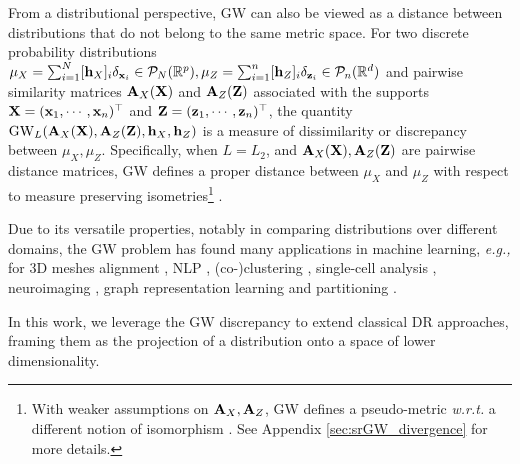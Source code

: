 From a distributional perspective, GW can also be viewed as a distance between distributions that do not belong to the same metric space. For two discrete probability distributions $\mu_X = \sum_{i=1}^N [{\mathbf{h}}_X]_i \delta_{{\mathbf{x}}_i} \in {\mathcal{P}}_N(\mathbb{R}^{p}), \mu_Z =\sum_{i=1}^n [{\mathbf{h}}_Z]_i \delta_{{\mathbf{z}}_i} \in {\mathcal{P}}_n(\mathbb{R}^d)$ and pairwise similarity matrices ${\mathbf{A}}_{X}({\mathbf{X}})$ and ${\mathbf{A}}_{Z}({\mathbf{Z}})$ associated with the supports ${\mathbf{X}} = ({\mathbf{x}}_1, \cdots, {\mathbf{x}}_n)^\top$ and ${\mathbf{Z}} = ({\mathbf{z}}_1, \cdots, {\mathbf{z}}_n)^\top$, the quantity $\operatorname{GW}_L ({\mathbf{A}}_{X}({\mathbf{X}}), {\mathbf{A}}_{Z}({\mathbf{Z}}), {\mathbf{h}}_X, {\mathbf{h}}_Z)$ is a measure of dissimilarity or discrepancy between $\mu_X, \mu_Z$. Specifically, when $L=L_2$, and ${\mathbf{A}}_{X}({\mathbf{X}}), {\mathbf{A}}_{Z}({\mathbf{Z}})$ are pairwise distance matrices, GW defines a proper distance between $\mu_X$ and $\mu_Z$ with respect to measure preserving isometries\footnote{With weaker assumptions on ${\mathbf{A}}_{X}, {\mathbf{A}}_{Z}$, GW defines a pseudo-metric \textit{w.r.t.} a different notion of isomorphism \citep{chowdhury2019gromov}. See Appendix \ref{sec:srGW_divergence} for more details.} \citep{memoli2011gromov}. 

Due to its versatile properties, notably in comparing distributions over different domains,  the GW problem has found many applications in machine learning, \textit{e.g.,} for 3D meshes alignment \citep{solomon2016entropic,ezuz2017gwcnn}, NLP \citep{alvarez2018gromov}, (co-)clustering  \citep{peyre2016gromov, redko2020co}, single-cell analysis \citep{demetci2020gromov}, neuroimaging \citep{thual2022aligning}, graph representation learning \citep{xu2020gromov, vincent2021online, liu2022robust, vincent2022template, pmlr-v202-zeng23c} and partitioning \citep{xu2019scalable, chowdhury2021generalized}.

In this work, we leverage the GW discrepancy to extend classical DR approaches, framing them as the projection of a distribution onto a space of lower dimensionality. 